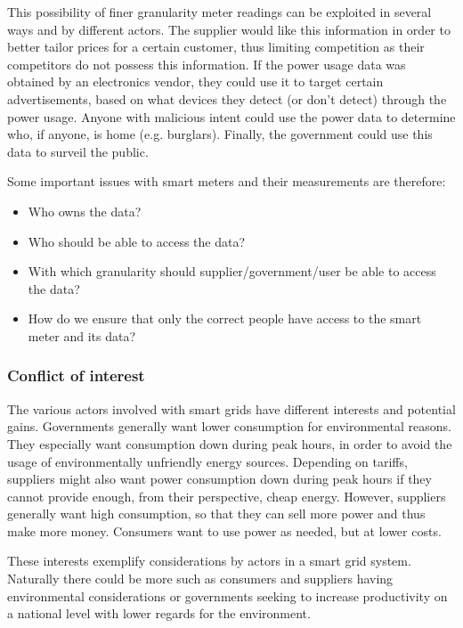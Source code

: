 This possibility of finer granularity meter readings can be exploited in several ways and by different actors.
The supplier would like this information in order to better tailor prices for a certain customer, thus limiting competition as their competitors do not possess this information.
If the power usage data was obtained by an electronics vendor, they could use it to target certain advertisements, based on what devices they detect (or don't detect) through the power usage.
Anyone with malicious intent could use the power data to determine who, if anyone, is home (e.g. burglars).
Finally, the government could use this data to surveil the public.

Some important issues with smart meters and their measurements are therefore:
\begin{itemize}
	\item Who owns the data?
	\item Who should be able to access the data?
	\item With which granularity should supplier/government/user be able to access the data?
	\item How do we ensure that only the correct people have access to the smart meter and its data?
\end{itemize}

\subsubsection{Conflict of interest}
The various actors involved with smart grids have different interests and potential gains.
Governments generally want lower consumption for environmental reasons.
They especially want consumption down during peak hours, in order to avoid the usage of environmentally unfriendly energy sources.
Depending on tariffs, suppliers might also want power consumption down during peak hours if they cannot provide enough, from their perspective, cheap energy.
However, suppliers generally want high consumption, so that they can sell more power and thus make more money.
Consumers want to use power as needed, but at lower costs.

These interests exemplify considerations by actors in a smart grid system.
Naturally there could be more such as consumers and suppliers having environmental considerations or governments seeking to increase productivity on a national level with lower regards for the environment.

